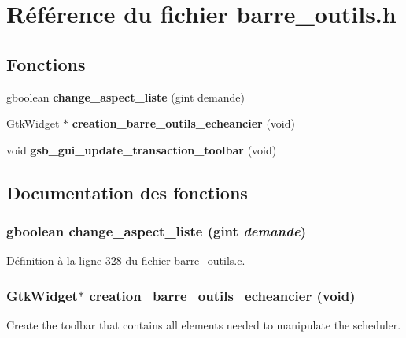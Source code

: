 \section{Référence du fichier barre\_\-outils.h}
\label{barre__outils_8h}
\subsection*{Fonctions}
\begin{DoxyCompactItemize}
\item 
gboolean {\bf change\_\-aspect\_\-liste} (gint demande)
\item 
GtkWidget $\ast$ {\bf creation\_\-barre\_\-outils\_\-echeancier} (void)
\item 
void {\bf gsb\_\-gui\_\-update\_\-transaction\_\-toolbar} (void)
\end{DoxyCompactItemize}


\subsection{Documentation des fonctions}
\subsubsection[{change\_\-aspect\_\-liste}]{\setlength{\rightskip}{0pt plus 5cm}gboolean change\_\-aspect\_\-liste (gint {\em demande})}\label{barre__outils_8h_ae695ec2f9683a33728d94f301b83aaa9}


Définition à la ligne 328 du fichier barre\_\-outils.c.

\subsubsection[{creation\_\-barre\_\-outils\_\-echeancier}]{\setlength{\rightskip}{0pt plus 5cm}GtkWidget$\ast$ creation\_\-barre\_\-outils\_\-echeancier (void)}\label{barre__outils_8h_a9f1ea21cc01c1a429a23c478fc9ca868}
Create the toolbar that contains all elements needed to manipulate the scheduler.


